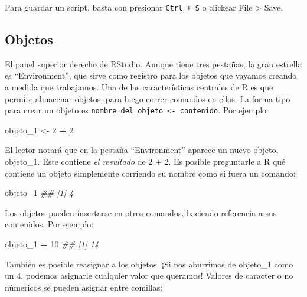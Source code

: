 \documentclass[]{book}
\newenvironment{Shaded}{\begin{snugshade}}{\end{snugshade}}
\newcommand{\CommentTok}[1]{\textcolor[rgb]{0.56,0.35,0.01}{\textit{#1}}}
\newcommand{\DecValTok}[1]{\textcolor[rgb]{0.00,0.00,0.81}{#1}}
\newcommand{\NormalTok}[1]{#1}
\newcommand{\OperatorTok}[1]{\textcolor[rgb]{0.81,0.36,0.00}{\textbf{#1}}}
\newcommand{\StringTok}[1]{\textcolor[rgb]{0.31,0.60,0.02}{#1}}
\begin{document}
Para guardar un script, basta con presionar \texttt{Ctrl\ +\ S} o
clickear File \textgreater{} Save.

\hypertarget{objetos}{%
\subsection{Objetos}\label{objetos}}

El panel superior derecho de RStudio. Aunque tiene tres pestañas, la
gran estrella es ``Environment'', que sirve como registro para los
objetos que vayamos creando a medida que trabajamos. Una de las
características centrales de R es que permite almacenar objetos, para
luego correr comandos en ellos. La forma tipo para crear un objeto es
\texttt{nombre\_del\_objeto\ \textless{}-\ contenido}. Por ejemplo:

\begin{Shaded}
\begin{Highlighting}[]
\NormalTok{objeto_}\DecValTok{1}\NormalTok{ <-}\StringTok{ }\DecValTok{2} \OperatorTok{+}\StringTok{ }\DecValTok{2}
\end{Highlighting}
\end{Shaded}

El lector notará que en la pestaña ``Environment'' aparece un nuevo
objeto, objeto\_1. Este contiene \emph{el resultado} de 2 + 2. Es
posible preguntarle a R qué contiene un objeto simplemente corriendo su
nombre como si fuera un comando:

\begin{Shaded}
\begin{Highlighting}[]
\NormalTok{objeto_}\DecValTok{1}
\CommentTok{## [1] 4}
\end{Highlighting}
\end{Shaded}

Los objetos pueden insertarse en otros comandos, haciendo referencia a
sus contenidos. Por ejemplo:

\begin{Shaded}
\begin{Highlighting}[]
\NormalTok{objeto_}\DecValTok{1} \OperatorTok{+}\StringTok{ }\DecValTok{10}
\CommentTok{## [1] 14}
\end{Highlighting}
\end{Shaded}

También es posible reasignar a los objetos. ¡Si nos aburrimos de
objeto\_1 como un 4, podemos asignarle cualquier valor que queramos!
Valores de caracter o no númericos se pueden asignar entre comillas:
\end{document}
